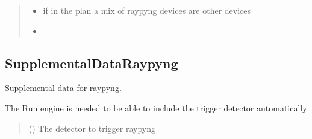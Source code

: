 \documentclass[letterpaper,10pt,english]{sphinxmanual}
\begin{document}
\begin{fulllineitems}
\begin{quote}
\begin{description}
\begin{itemize}
\end{itemize}

\begin{itemize}
\item {} 
\sphinxAtStartPar
{} \textendash{} if in the plan a mix of raypyng devices are other devices

\item {} 
\sphinxAtStartPar
{} \textendash{} 

\end{itemize}

\end{description}\end{quote}

\end{fulllineitems}



\subsection{SupplementalDataRaypyng}
\label{\detokenize{API:supplementaldataraypyng}}

\begin{fulllineitems}
\label{\detokenize{API:raypyng_bluesky.preprocessor.SupplementalDataRaypyng}}
\pysigstartsignatures
{}
\pysigstopsignatures
\sphinxAtStartPar
Supplemental data for raypyng.

\sphinxAtStartPar
The Run engine is needed to be able to include the
trigger detector automatically
\begin{quote}\begin{description}
\sphinxAtStartPar
{} ({\hyperref[\detokenize{API:raypyng_bluesky.detector.RaypyngTriggerDetector}]{}}) \textendash{} The detector to trigger raypyng

\end{description}\end{quote}

\end{fulllineitems}




\renewcommand{\indexname}{Index}
\printindex
\end{document}
